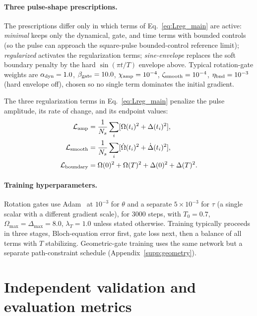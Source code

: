 \documentclass[aps,prx,reprint,superscriptaddress,nofootinbib,longbibliography,floatfix,showkeys]{revtex4-2}
\newcommand{\appsecref}[1]{Appendix~\hyperref[#1]{\ref*{#1}}}
\begin{document}
\paragraph{Three pulse-shape prescriptions.}
The prescriptions differ only in which terms of Eq.~\eqref{eq:Lreg_main} are active: \emph{minimal} keeps only the dynamical, gate, and time terms with bounded controls (so the pulse can approach the square-pulse bounded-control reference limit); \emph{regularized} activates the regularization terms; \emph{sine-envelope} replaces the soft boundary penalty by the hard $\sin(\pi t/T)$ envelope above.  Typical rotation-gate weights are $\alpha_{\rm dyn}=1.0$, $\beta_{\rm gate}=10.0$, $\chi_{\rm amp}=10^{-4}$, $\zeta_{\rm smooth}=10^{-4}$, $\eta_{\rm bnd}=10^{-3}$ (hard envelope off), chosen so no single term dominates the initial gradient.

The three regularization terms in Eq.~\eqref{eq:Lreg_main} penalize the pulse amplitude, its rate of change, and its endpoint values:
\begin{equation}
\begin{aligned}
    \mathcal L_{\rm amp}&=\frac{1}{N_s}\sum_i[\Omega(t_i)^2+\Delta(t_i)^2],\\
    \mathcal L_{\rm smooth}&=\frac{1}{N_s}\sum_i[\dot\Omega(t_i)^2+\dot\Delta(t_i)^2],\\
    \mathcal L_{\rm boundary}&=\Omega(0)^2+\Omega(T)^2+\Delta(0)^2+\Delta(T)^2.
\end{aligned}
\end{equation}

\paragraph{Training hyperparameters.}
Rotation gates use Adam~\cite{Kingma2015Adam} at $10^{-3}$ for $\theta$ and a separate $5\times10^{-3}$ for $\tau$ (a single scalar with a different gradient scale), for 3000 steps, with $T_0=0.7$, $\Omega_{\max}=\Delta_{\max}=8.0$, $\lambda_T=1.0$ unless stated otherwise.  Training typically proceeds in three stages, Bloch-equation error first, gate loss next, then a balance of all terms with $T$ stabilizing.  Geometric-gate training uses the same network but a separate path-constraint schedule (\appsecref{supp:geometry}).


\section{Independent validation and evaluation metrics}
\label{supp:validation}
\end{document}
